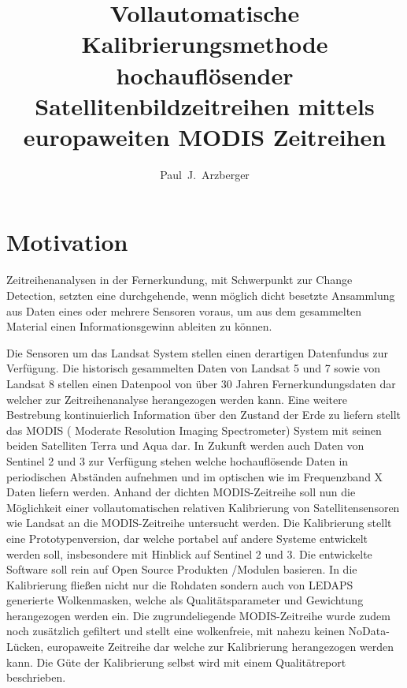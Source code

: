 \documentclass[11pt]{report}
\author{Paul~J.~Arzberger}
\title{Vollautomatische Kalibrierungsmethode hochauflösender Satellitenbildzeitreihen mittels europaweiten MODIS Zeitreihen}
\begin{document}
\maketitle

\tableofcontents
% 
% 
\chapter{Motivation}

Zeitreihenanalysen in der Fernerkundung, mit Schwerpunkt zur Change Detection, setzten eine durchgehende, wenn möglich dicht besetzte Ansammlung aus Daten eines oder mehrere Sensoren voraus, um aus dem gesammelten Material einen Informationsgewinn ableiten zu können.


Die Sensoren um das Landsat System stellen einen derartigen Datenfundus zur Verfügung. Die historisch gesammelten Daten von Landsat 5 und 7 sowie von Landsat 8 stellen einen Datenpool von über 30 Jahren Fernerkundungsdaten dar welcher zur Zeitreihenanalyse herangezogen werden kann. 
 Eine weitere Bestrebung kontinuierlich Information über den Zustand der Erde zu liefern stellt das MODIS ( Moderate Resolution Imaging Spectrometer) System mit seinen beiden Satelliten Terra und Aqua dar. In Zukunft werden auch Daten von Sentinel 2 und 3 zur Verfügung stehen welche hochauflösende Daten in periodischen Abständen aufnehmen und im optischen wie im Frequenzband X Daten liefern werden. Anhand der dichten MODIS-Zeitreihe soll nun die Möglichkeit einer vollautomatischen relativen Kalibrierung von Satellitensensoren wie Landsat an die MODIS-Zeitreihe untersucht werden. Die Kalibrierung  stellt eine Prototypenversion, dar welche portabel auf andere Systeme entwickelt werden soll, insbesondere mit Hinblick auf Sentinel 2 und 3. Die entwickelte Software soll rein auf Open Source Produkten /Modulen basieren. In die Kalibrierung fließen nicht nur die Rohdaten sondern auch von LEDAPS generierte Wolkenmasken, welche als Qualitätsparameter und Gewichtung herangezogen werden ein. Die zugrundeliegende MODIS-Zeitreihe wurde zudem noch zusätzlich gefiltert und stellt eine wolkenfreie, mit nahezu keinen NoData-Lücken, europaweite Zeitreihe dar welche zur Kalibrierung herangezogen werden kann. Die Güte der Kalibrierung selbst wird mit einem Qualitätreport beschrieben. 
\end{document}

